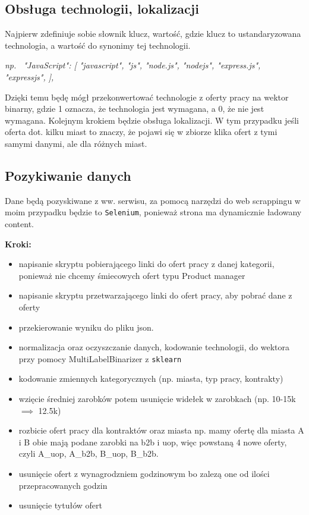 \documentclass[a4paper]{article}
\begin{document}
\subsection{Obsługa technologii, lokalizacji}

\quad Najpierw zdefiniuje sobie słownik klucz, wartość, gdzie klucz to ustandaryzowana technologia, a wartość do synonimy tej technologii.

\textit{np. \ "JavaScript": [
"javascript",
"js",
"node.js",
"nodejs",
"express.js",
"expressjs",
],}

\quad Dzięki temu będę mógł przekonwertować technologie z oferty pracy na wektor binarny, gdzie 1 oznacza, że technologia jest wymagana, a 0, że nie jest wymagana. Kolejnym
krokiem będzie obsługa lokalizacji. W tym przypadku jeśli oferta dot. kilku miast to znaczy, że pojawi się w zbiorze
klika ofert z tymi samymi danymi, ale dla różnych miast.


\subsection{Pozykiwanie danych}

\quad Dane będą pozyskiwane z ww. serwisu, za pomocą narzędzi do web scrappingu w moim przypadku będzie
to \texttt{Selenium}, ponieważ strona ma dynamicznie ładowany content.


\textbf{Kroki:}

\begin{itemize}
    \item napisanie skryptu pobierającego linki do ofert pracy z danej kategorii, ponieważ nie chcemy śmiecowych ofert typu Product manager
    \item napisanie skryptu przetwarzającego linki do ofert pracy, aby pobrać dane z oferty
    \item przekierowanie wyniku do pliku json.
    \item normalizacja oraz oczyszczanie danych, kodowanie technologii, do wektora przy pomocy MultiLabelBinarizer z \texttt{sklearn}
    \item kodowanie zmiennych kategorycznych (np. miasta, typ pracy, kontrakty)
    \item wzięcie średniej zarobków potem usunięcie widełek w zarobkach (np. 10-15k $\implies$ 12.5k)
    \item rozbicie ofert pracy dla kontraktów oraz miasta np. mamy ofertę dla miasta A i B obie mają podane
          zarobki na b2b i uop, więc powstaną 4 nowe oferty, czyli A\_uop, A\_b2b, B\_uop, B\_b2b.
    \item usunięcie ofert z wynagrodzniem godzinowym bo zalezą one od ilości przepracowanych godzin
    \item usunięcie tytułów ofert
\end{itemize}
\end{document}
